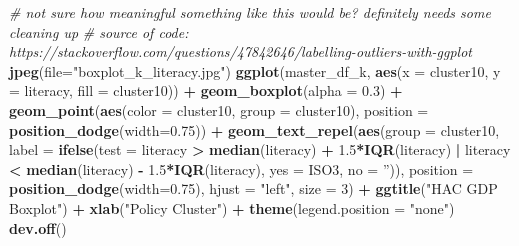 \documentclass[]{article}
\newenvironment{Shaded}{\begin{snugshade}}{\end{snugshade}}
\newcommand{\CommentTok}[1]{\textcolor[rgb]{0.56,0.35,0.01}{\textit{#1}}}
\newcommand{\DataTypeTok}[1]{\textcolor[rgb]{0.13,0.29,0.53}{#1}}
\newcommand{\DecValTok}[1]{\textcolor[rgb]{0.00,0.00,0.81}{#1}}
\newcommand{\FloatTok}[1]{\textcolor[rgb]{0.00,0.00,0.81}{#1}}
\newcommand{\KeywordTok}[1]{\textcolor[rgb]{0.13,0.29,0.53}{\textbf{#1}}}
\newcommand{\NormalTok}[1]{#1}
\newcommand{\OperatorTok}[1]{\textcolor[rgb]{0.81,0.36,0.00}{\textbf{#1}}}
\newcommand{\StringTok}[1]{\textcolor[rgb]{0.31,0.60,0.02}{#1}}
\begin{document}
\begin{Shaded}
\begin{Highlighting}[]
\CommentTok{# not sure how meaningful something like this would be? definitely needs some cleaning up}
\CommentTok{# source of code: https://stackoverflow.com/questions/47842646/labelling-outliers-with-ggplot}
\KeywordTok{jpeg}\NormalTok{(}\DataTypeTok{file=}\StringTok{"boxplot_k_literacy.jpg"}\NormalTok{)}
\KeywordTok{ggplot}\NormalTok{(master_df_k, }\KeywordTok{aes}\NormalTok{(}\DataTypeTok{x =}\NormalTok{ cluster10, }\DataTypeTok{y =}\NormalTok{ literacy, }\DataTypeTok{fill =}\NormalTok{ cluster10)) }\OperatorTok{+}
\StringTok{  }\KeywordTok{geom_boxplot}\NormalTok{(}\DataTypeTok{alpha =} \FloatTok{0.3}\NormalTok{) }\OperatorTok{+}
\StringTok{  }\KeywordTok{geom_point}\NormalTok{(}\KeywordTok{aes}\NormalTok{(}\DataTypeTok{color =}\NormalTok{ cluster10, }\DataTypeTok{group =}\NormalTok{ cluster10), }\DataTypeTok{position =} \KeywordTok{position_dodge}\NormalTok{(}\DataTypeTok{width=}\FloatTok{0.75}\NormalTok{)) }\OperatorTok{+}
\StringTok{  }\KeywordTok{geom_text_repel}\NormalTok{(}\KeywordTok{aes}\NormalTok{(}\DataTypeTok{group =}\NormalTok{ cluster10, }
                \DataTypeTok{label =} \KeywordTok{ifelse}\NormalTok{(}\DataTypeTok{test =}\NormalTok{ literacy }\OperatorTok{>}\StringTok{ }\KeywordTok{median}\NormalTok{(literacy) }\OperatorTok{+}\StringTok{ }\FloatTok{1.5}\OperatorTok{*}\KeywordTok{IQR}\NormalTok{(literacy)}
                               \OperatorTok{|}\StringTok{ }\NormalTok{literacy }\OperatorTok{<}\StringTok{ }\KeywordTok{median}\NormalTok{(literacy) }\OperatorTok{-}\StringTok{ }\FloatTok{1.5}\OperatorTok{*}\KeywordTok{IQR}\NormalTok{(literacy), }
                  \DataTypeTok{yes =}\NormalTok{ ISO3,}
                  \DataTypeTok{no =} \StringTok{''}\NormalTok{)), }
            \DataTypeTok{position =} \KeywordTok{position_dodge}\NormalTok{(}\DataTypeTok{width=}\FloatTok{0.75}\NormalTok{),}
            \DataTypeTok{hjust =} \StringTok{"left"}\NormalTok{, }\DataTypeTok{size =} \DecValTok{3}\NormalTok{) }\OperatorTok{+}\StringTok{ }\KeywordTok{ggtitle}\NormalTok{(}\StringTok{"HAC GDP Boxplot"}\NormalTok{) }\OperatorTok{+}\StringTok{ }\KeywordTok{xlab}\NormalTok{(}\StringTok{"Policy Cluster"}\NormalTok{) }\OperatorTok{+}\StringTok{ }
\StringTok{  }\KeywordTok{theme}\NormalTok{(}\DataTypeTok{legend.position =} \StringTok{"none"}\NormalTok{)}
\KeywordTok{dev.off}\NormalTok{()}
\end{Highlighting}
\end{Shaded}
\end{document}
